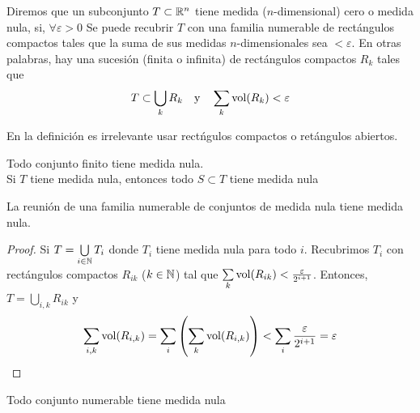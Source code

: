 \begin{defi}
	Diremos que un subconjunto $T \subset \mathbb{R}^n$ tiene medida ($n$-dimensional)
	cero o medida nula, si, $\forall \varepsilon > 0$ Se puede recubrir $T$ con
	una familia numerable de rectángulos compactos tales que la suma de sus
	medidas $n$-dimensionales sea $< \varepsilon$. En otras palabras, hay una
	sucesión (finita o infinita) de rectángulos compactos $R_k$ tales que
	\[
		T \subset \bigcup_k R_k \quad \text{y} \quad \sum_k \operatorname{vol}(R_k) <
		\varepsilon
	\]
\end{defi}
\begin{obs*}
	En la definición es irrelevante usar rectńgulos compactos o retángulos
	abiertos.
\end{obs*}
\begin{obs}
	Todo conjunto finito tiene medida nula.\\
	Si $T$ tiene medida nula, entonces todo $S \subset T$ tiene medida nula
\end{obs}
\begin{prop} \label{prop_2_2_3}
	La reunión de una familia numerable de conjuntos de medida nula tiene
	medida nula.
\end{prop}
\begin{proof}
	Si $T = \bigcup\limits_{i \in \mathbb{N}} T_i$ donde $T_i$ tiene medida nula para todo
	$i$. Recubrimos $T_i$ con rectángulos compactos $R_{ik}$ ($k \in \mathbb{N}$) tal que
	$\sum\limits_k \operatorname{vol}(R_{ik}) < \frac{\varepsilon}{2^{i+1}}$. Entonces,
	$T = \bigcup\limits_{i,k} R_{ik}$ y
	\[
		\sum_{i,k} \operatorname{vol}(R_{i,k}) = \sum_i \left( \sum_k \operatorname{vol}(R_{i,k}) \right) <
		\sum_i \frac{\varepsilon}{2^{i+1}} = \varepsilon
	\]
\end{proof}

\begin{col*}
	Todo conjunto numerable tiene medida nula
\end{col*}

